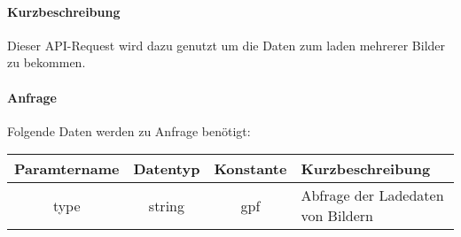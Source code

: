 \paragraph{Kurzbeschreibung}Dieser API-Request wird dazu genutzt um die Daten zum laden mehrerer Bilder zu bekommen.
\paragraph{Anfrage}Folgende Daten werden zu Anfrage benötigt:
\begin{table}[H]
	\begin{tabular}{|c|c|c|p{6.5cm}|}
		\hline
		\textbf{Paramtername} & \textbf{Datentyp} & \textbf{Konstante} & \textbf{Kurzbeschreibung}                                                                                               \\ \hline
		type                & string            & gpf                & Abfrage der Ladedaten von Bildern \\ \hline
	\end{tabular}
\end{table}
